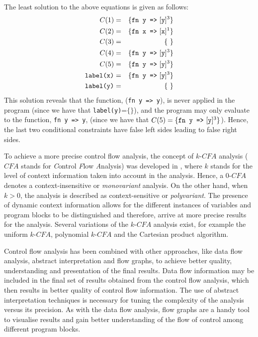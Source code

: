 \documentclass[10pt,a4paper,final,oneside,fleqn]{book}
\begin{document}
The least solution to the above equations is given as follows:
\begin{eqnarray*}
C(1)&=&\{\mbox{\texttt{fn y =>} }[\mbox{\texttt{y}}]^3\}\\
C(2)&=&\{\mbox{\texttt{fn x =>} }[\mbox{\texttt{x}}]^1\}\\
C(3)&=&\{~\}\\
C(4)&=&\{\mbox{\texttt{fn y =>} }[\mbox{\texttt{y}}]^3\}\\
C(5)&=&\{\mbox{\texttt{fn y =>} }[\mbox{\texttt{y}}]^3\}\\
\texttt{label(x)}&=&\{\mbox{\texttt{fn y =>} }[\mbox{\texttt{y}}]^3\}\\
\texttt{label(y)}&=&\{~\}
\end{eqnarray*}
This solution reveals that the function, (\texttt{fn y => y}), is never applied in the program (since we have that \texttt{label(y)}=$\{\}$), and the program may only evaluate to the function, \texttt{fn y => y}, (since we have that $C(5)=\{\mbox{\texttt{fn y =>} }[\mbox{\texttt{y}}]^3\}$). Hence, the last two conditional constraints have false left sides leading to false right sides.

To achieve a more precise control flow analysis, the concept of $k$-$CFA$ analysis ($CFA$ stands for {\itshape C\/}ontrol {\itshape F\/}low {\itshape A\/}nalysis) was developed in \cite{shivers1}, where $k$ stands for the level of context information taken into account in the analysis.  Hence, a $0$-$CFA$ denotes a context-insensitive or {\itshape monovariant\/} analysis.  On the other hand, when $k>0$, the analysis is described as context-sensitive or {\itshape polyvariant\/}.  The presence of dynamic context information allows for the different instances of variables and program blocks to be distinguished and therefore, arrive at more precise results for the analysis.  Several variations of the $k$-$CFA$ analysis exist, for example the uniform $k$-$CFA$, polynomial $k$-$CFA$ and the Cartesian product algorithm.

Control flow analysis has been combined with other approaches, like data flow analysis, abstract interpretation and flow graphs, to achieve better quality, understanding and presentation of the final results.  Data flow information may be included in the final set of results obtained from the control flow analysis, which then results in better quality of control flow information.  The use of abstract interpretation techniques is necessary for tuning the complexity of the analysis versus its precision.  As with the data flow analysis, flow graphs are a handy tool to visualise results and gain better understanding of the flow of control among different program blocks.
\end{document}
